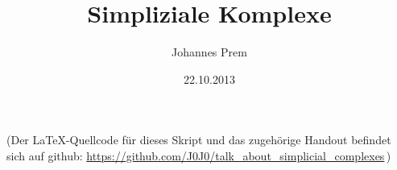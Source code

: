 
\subject{Seminar: Topologie vs. Kombinatorik}
\title{Simpliziale Komplexe}
\author{Johannes Prem}
\date{22.10.2013}

\maketitle
\thispagestyle{empty}

\vfill
\begin{center}\footnotesize%
    (Der \LaTeX-Quellcode für dieses Skript und das zugehörige Handout befindet
    sich auf github: 
    \url{https://github.com/J0J0/talk_about_simplicial_complexes}\,)
\end{center}
\newpage
